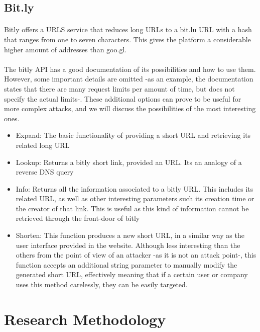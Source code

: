 \documentclass[12pt]{article}
\begin{document}
\subsection{Bit.ly}

\paragraph{}
Bitly offers a URLS service that reduces long URLs to a bit.lu URL with a hash that ranges from one to seven characters. This gives the platform a considerable higher amount of addresses than goo.gl.

\paragraph{}
The bitly API has a good documentation of its possibilities and how to use them. However, some important details are omitted -as an example, the documentation states that there are many request limits per amount of time, but does not specify the actual limits-. These additional options can prove to be useful for more complex attacks, and we will discuss the possibilities of the most interesting ones. \cite{bitly}

\begin{itemize}

\item {Expand: The basic functionality of providing a short URL and retrieving its related long URL}
\item{Lookup: Returns a bitly short link, provided an URL. Its an analogy of a reverse DNS query}
\item {Info: Returns all the information associated to a bitly URL. This includes its related URL, as  well as other interesting parameters such its creation time or the creator of that link. This is useful as this kind of information cannot be retrieved through the front-door of bitly}
\item {Shorten: This function produces a new short URL, in a similar way as the user interface provided in the website. Although less interesting than the others from the point of view of an attacker -as it is not an attack point-, this function accepts an additional string parameter to manually modify the generated short URL, effectively meaning that if a certain user or company uses this method carelessly, they can be easily targeted.}
\end{itemize}


\newpage
\section{Research Methodology}
\end{document}
